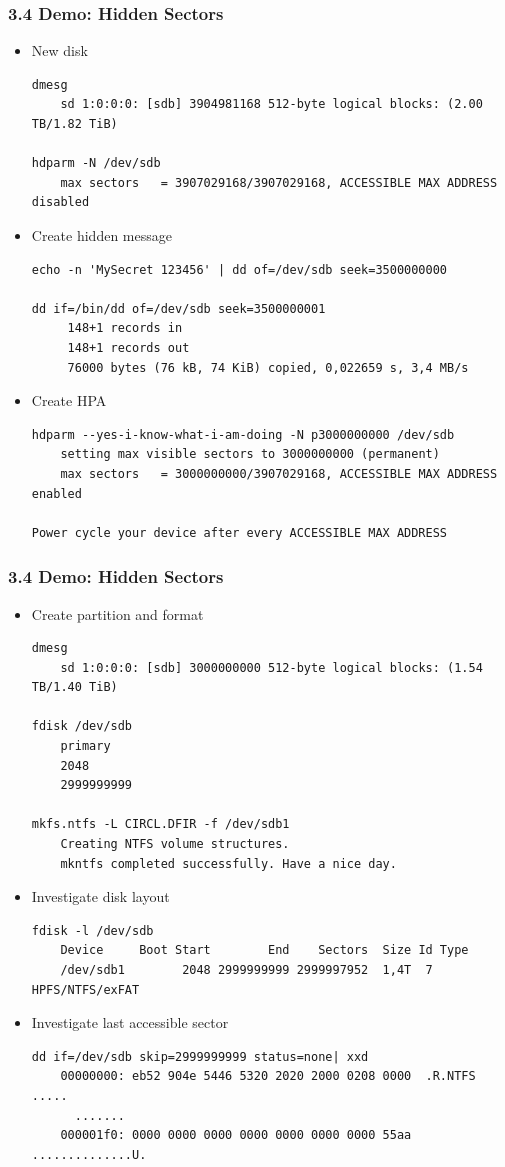 \begin{frame}[fragile]
  \frametitle{3.4 Demo: Hidden Sectors}
    \begin{itemize}
        \item New disk
\begin{lstlisting}[basicstyle=\tiny]
dmesg
    sd 1:0:0:0: [sdb] 3904981168 512-byte logical blocks: (2.00 TB/1.82 TiB)

hdparm -N /dev/sdb
    max sectors   = 3907029168/3907029168, ACCESSIBLE MAX ADDRESS disabled
\end{lstlisting}
        \item Create hidden message
\begin{lstlisting}[basicstyle=\tiny]
echo -n 'MySecret 123456' | dd of=/dev/sdb seek=3500000000

dd if=/bin/dd of=/dev/sdb seek=3500000001
     148+1 records in
     148+1 records out
     76000 bytes (76 kB, 74 KiB) copied, 0,022659 s, 3,4 MB/s
\end{lstlisting}
        \item Create HPA
\begin{lstlisting}[basicstyle=\tiny]
hdparm --yes-i-know-what-i-am-doing -N p3000000000 /dev/sdb
    setting max visible sectors to 3000000000 (permanent)
    max sectors   = 3000000000/3907029168, ACCESSIBLE MAX ADDRESS enabled

Power cycle your device after every ACCESSIBLE MAX ADDRESS
\end{lstlisting}
    \end{itemize}
\end{frame}


\begin{frame}[fragile]
  \frametitle{3.4 Demo: Hidden Sectors}
    \begin{itemize}
        \item Create partition and format
\begin{lstlisting}[basicstyle=\tiny]
dmesg
    sd 1:0:0:0: [sdb] 3000000000 512-byte logical blocks: (1.54 TB/1.40 TiB)

fdisk /dev/sdb
    primary
    2048
    2999999999

mkfs.ntfs -L CIRCL.DFIR -f /dev/sdb1
    Creating NTFS volume structures.
    mkntfs completed successfully. Have a nice day.
\end{lstlisting}
        \item Investigate disk layout
\begin{lstlisting}[basicstyle=\tiny]
fdisk -l /dev/sdb
    Device     Boot Start        End    Sectors  Size Id Type
    /dev/sdb1        2048 2999999999 2999997952  1,4T  7 HPFS/NTFS/exFAT
\end{lstlisting}
        \item Investigate last accessible sector
\begin{lstlisting}[basicstyle=\tiny]
dd if=/dev/sdb skip=2999999999 status=none| xxd
    00000000: eb52 904e 5446 5320 2020 2000 0208 0000  .R.NTFS    .....
      .......
    000001f0: 0000 0000 0000 0000 0000 0000 0000 55aa  ..............U.
\end{lstlisting}
    \end{itemize}
\end{frame}


